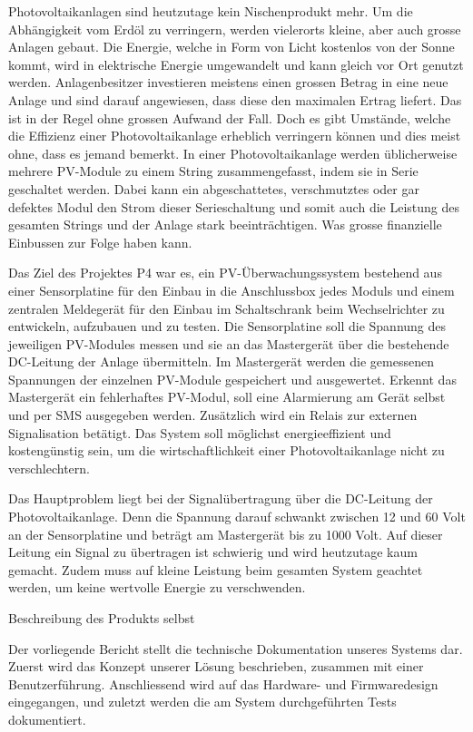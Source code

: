 Photovoltaikanlagen   sind  heutzutage   kein   Nischenprodukt  mehr. Um   die
Abhängigkeit  vom Erdöl  zu verringern,  werden vielerorts  kleine, aber  auch
grosse Anlagen  gebaut. Die Energie,  welche in Form  von Licht  kostenlos von
der  Sonne kommt,  wird in  elektrische  Energie umgewandelt  und kann  gleich
vor  Ort genutzt  werden. Anlagenbesitzer investieren  meistens einen  grossen
Betrag  in  eine neue  Anlage  und  sind  darauf  angewiesen, dass  diese  den
maximalen  Ertrag liefert. Das  ist  in  der Regel  ohne  grossen Aufwand  der
Fall. Doch  es gibt  Umstände, welche  die Effizienz  einer Photovoltaikanlage
erheblich verringern können  und dies meist ohne, dass es  jemand bemerkt.  In
einer  Photovoltaikanlage  werden  üblicherweise mehrere  PV-Module  zu  einem
String zusammengefasst, indem  sie in Serie geschaltet  werden. Dabei kann ein
abgeschattetes,  verschmutztes  oder  gar  defektes  Modul  den  Strom  dieser
Serieschaltung und somit auch die Leistung des gesamten Strings und der Anlage
stark beeinträchtigen. Was grosse finanzielle Einbussen zur Folge haben kann.

Das  Ziel des  Projektes P4  war es,  ein PV-Überwachungssystem  bestehend aus
einer Sensorplatine für den Einbau in  die Anschlussbox jedes Moduls und einem
zentralen Meldegerät  für den Einbau  im Schaltschrank beim  Wechselrichter zu
entwickeln, aufzubauen und zu testen. Die  Sensorplatine soll die Spannung des
jeweiligen PV-Modules  messen und sie  an das Mastergerät über  die bestehende
DC-Leitung  der  Anlage  übermitteln. Im  Mastergerät  werden  die  gemessenen
Spannungen der  einzelnen PV-Module  gespeichert und  ausgewertet. Erkennt das
Mastergerät ein fehlerhaftes  PV-Modul, soll eine Alarmierung  am Gerät selbst
und  per  SMS  ausgegeben  werden. Zusätzlich wird  ein  Relais  zur  externen
Signalisation  betätigt.   Das  System  soll  möglichst  energieeffizient  und
kostengünstig sein,  um die wirtschaftlichkeit einer  Photovoltaikanlage nicht
zu verschlechtern.

Das  Hauptproblem liegt  bei  der Signalübertragung  über  die DC-Leitung  der
Photovoltaikanlage. Denn die Spannung darauf schwankt  zwischen 12 und 60 Volt
an der Sensorplatine  und beträgt am Mastergerät bis zu  1000 Volt. Auf dieser
Leitung  ein Signal  zu  übertragen  ist schwierig  und  wird heutzutage  kaum
gemacht.  Zudem muss auf kleine Leistung beim gesamten System geachtet werden,
um keine wertvolle Energie zu verschwenden.

 Beschreibung des Produkts selbst

Der vorliegende  Bericht stellt  die technische Dokumentation  unseres Systems
dar.  Zuerst wird das Konzept unserer L\"osung beschrieben, zusammen mit einer
Benutzerf\"uhrung.  Anschliessend  wird auf  das Hardware-  und Firmwaredesign
eingegangen,  und   zuletzt  werden  die  am   System  durchgef\"uhrten  Tests
dokumentiert.
